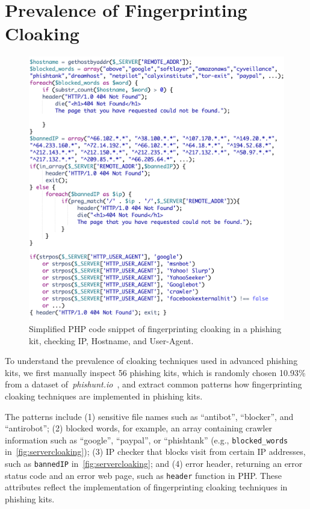 \section{Prevalence of Fingerprinting Cloaking}
\label{s:prevalence}

\begin{figure}
\centering
\includegraphics[width=\linewidth]{figs/server_cloaking2.png}
\caption{Simplified PHP code snippet of fingerprinting cloaking in a phishing kit, checking IP, Hostname, and User-Agent.}
\label{fig:servercloaking}
\end{figure}

To understand the prevalence of cloaking techniques used in advanced phishing kits,
we first manually inspect 56 phishing kits, 
which is randomly chosen 10.93\% from a dataset of~\emph{phishunt.io}~\cite{phishunt},
and extract common patterns how fingerprinting cloaking techniques are implemented in phishing kits.

The patterns include (1) sensitive file names such as ``antibot'', ``blocker'', and ``antirobot''; (2) blocked words, for example, an array containing crawler information such as ``google'', ``paypal'', or ``phishtank'' (e.g., \texttt{blocked\_words} in~\autoref{fig:servercloaking}); (3) IP checker that blocks visit from certain IP addresses, such as \texttt{bannedIP} in~\autoref{fig:servercloaking}; and (4) error header, returning an error status code and an error web page, such as \texttt{header} function in PHP.
These attributes reflect the implementation of fingerprinting cloaking techniques in phishing kits.

